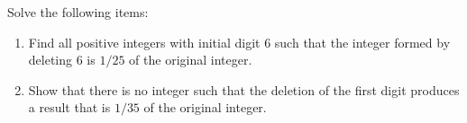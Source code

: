 Solve the following items:
\begin{enumerate}[label = (\alph*)]
	\item Find all positive integers with initial digit 6 such that the integer formed by deleting 6 is $1/25$ of the original integer.

	\item Show that there is no integer such that the deletion of the first digit produces a result that is $1/35$ of the original integer.
\end{enumerate}
